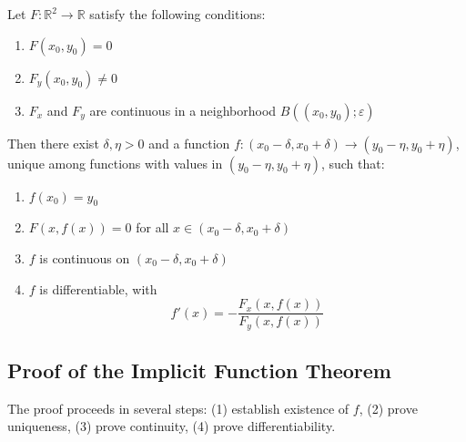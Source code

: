 \documentclass[11pt]{report}
\newcommand{\R}{\mathbb{R}}
\begin{document}
\begin{theorem}
Let $F : \R^2 \to \R$ satisfy the following conditions:
\begin{enumerate}[label=(\roman*)]
    \item $F(x_0, y_0) = 0$
    \item $F_y(x_0, y_0) \neq 0$
    \item $F_x$ and $F_y$ are continuous in a neighborhood $B((x_0, y_0); \varepsilon)$
\end{enumerate}

Then there exist $\delta, \eta > 0$ and a function $f : (x_0 - \delta, x_0 + \delta) \to (y_0 - \eta, y_0 + \eta)$, unique among functions with values in $(y_0 - \eta, y_0 + \eta)$, such that:
\begin{enumerate}[label=(\alph*)]
    \item $f(x_0) = y_0$
    \item $F(x, f(x)) = 0$ for all $x \in (x_0 - \delta, x_0 + \delta)$
    \item $f$ is continuous on $(x_0 - \delta, x_0 + \delta)$
    \item $f$ is differentiable, with
    \[
    f'(x) = -\frac{F_x(x, f(x))}{F_y(x, f(x))}
    \]
\end{enumerate}
\end{theorem}

\subsection{Proof of the Implicit Function Theorem}

The proof proceeds in several steps: (1) establish existence of $f$, (2) prove uniqueness, (3) prove continuity, (4) prove differentiability.
\end{document}
